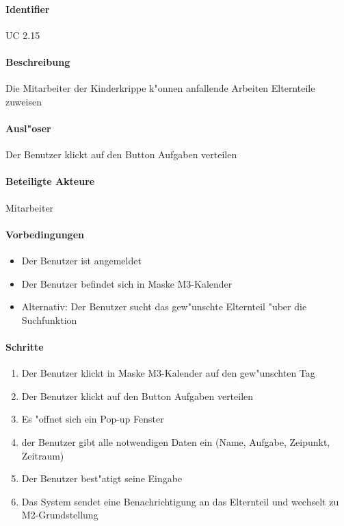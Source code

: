   \paragraph{Identifier}
  UC 2.15
  \paragraph{Beschreibung}
  Die Mitarbeiter der Kinderkrippe k"onnen anfallende Arbeiten Elternteile zuweisen
  \paragraph{Ausl"oser}
  Der Benutzer klickt auf den Button \dq Aufgaben verteilen\dq
  \paragraph{Beteiligte Akteure}   \leavevmode \newline
    Mitarbeiter
  \paragraph{Vorbedingungen}
  \begin{itemize}
   \item Der Benutzer ist angemeldet
   \item Der Benutzer befindet sich in Maske M3-Kalender
   \item Alternativ: Der Benutzer sucht das gew"unschte Elternteil "uber die Suchfunktion
  \end{itemize}

  \paragraph{Schritte}
  \begin{enumerate}
  \item Der Benutzer klickt in Maske M3-Kalender auf den gew"unschten Tag
  \item Der Benutzer klickt auf den Button \dq Aufgaben verteilen\dq
  \item Es "offnet sich ein Pop-up Fenster
  \item der Benutzer gibt alle notwendigen Daten ein (Name, Aufgabe, Zeipunkt, Zeitraum)
  \item Der Benutzer best"atigt seine Eingabe
  \item Das System sendet eine Benachrichtigung an das Elternteil und wechselt zu M2-Grundstellung
  \end{enumerate}
  
